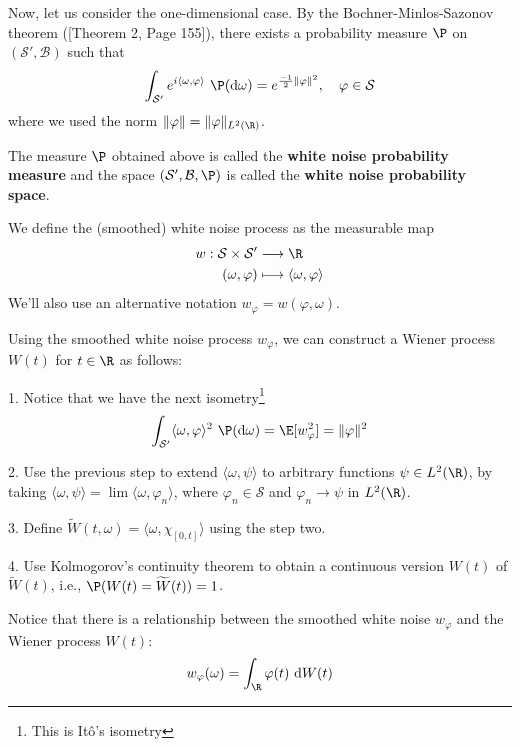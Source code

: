 Now, let us consider the one-dimensional case. By the Bochner-Minlos-Sazonov theorem (\cite{gelfand1964}[Theorem 2, Page 155]), there exists a probability measure $\P$ on $(\mathcal{S}', \mathcal{B})$ such that
\[
\int_{\mathcal{S}'} e^{i \langle \omega, \varphi \rangle} ~\P(\mathrm{d}\omega) = e^{\frac{-1}{2} \|\varphi\|^2}, \quad \varphi \in \mathcal{S}
\]
where we used the norm $\|\varphi\| = \|\varphi\|_{L^2(\R)}$.

The measure $\P$ obtained above is called the \textbf{white noise probability measure} and the space $(\mathcal{S}', \mathcal{B}, \P)$ is called the \textbf{white noise probability space}.
  
\begin{definition}
We define the (smoothed) white noise process as the measurable map
\begin{equation*}
\begin{aligned}
w : \mathcal{S} \times \mathcal{S}' &\longrightarrow \R \\
(\omega, \varphi) &\longmapsto \langle \omega, \varphi \rangle
\end{aligned}
\end{equation*} 
We'll also use an alternative notation $w_\varphi = w(\varphi, \omega)$.
\end{definition}  
  
Using the smoothed white noise process $w_\varphi$, we can construct a Wiener process $W(t)$ for $t \in \R$ as follows:

1. Notice that we have the next isometry\footnote{This is Itô's isometry}
\begin{equation}\label{eq:222404221615}
\int_{\mathcal{S}'} \langle \omega, \varphi \rangle^ 2 ~\P(\mathrm{d}\omega) = \E[w_\varphi^2] = \| \varphi \|^2
\end{equation}

2. Use the previous step to extend $\langle \omega, \psi \rangle$ to arbitrary functions $\psi \in L^2(\R)$, by taking $\langle \omega, \psi \rangle = \lim \langle \omega, \varphi_n \rangle$, where $\varphi_n \in \mathcal{S}$ and $\varphi_n \to \psi$ in $L^2(\R)$.

3. Define $\widetilde{W}(t, \omega) = \langle \omega, \chi_{[0,t]} \rangle$ using the step two.

4. Use Kolmogorov's continuity theorem to obtain a continuous version $W(t)$ of $\widetilde{W}(t)$, i.e., $\P(W(t) = \widetilde{W}(t)) = 1$.

Notice that there is a relationship between the smoothed white noise $w_\varphi$ and the Wiener process $W(t)$:
\[
w_\varphi(\omega) = \int_\R \varphi(t) ~\mathrm{d}W(t)
\]

